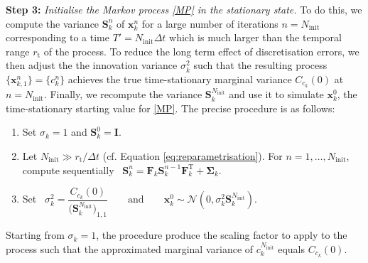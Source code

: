 \documentclass[12pt]{article} %
\newcommand{\cb}{\color{blue}}
\begin{document}
\noindent \textbf{Step 3:} {\em Initialise the Markov process \eqref{MP} in the stationary state.} 
To do this,
we compute the variance $\mathbf{S}^n_k$ of $\mathbf x_k^n$  for a large number of iterations $n=N_{\mathrm{init}}$ corresponding to a time $T'=N_{\mathrm{init}}\Delta t$ 
which is much larger than the temporal range $r_\mathrm{t}$ of the process. %
To reduce the long term effect of discretisation errors, we then
adjust the the innovation variance $\sigma_k^2$ such that the resulting process $\{\mathbf{x}_{k,1}^{n}\}=\{c_k^{n}\}$ achieves the true time-stationary marginal variance $C_{c_k}(0)$ at $n=N_{\mathrm{init}}$. Finally, we recompute the variance $\mathbf{S}_k^{N_{\mathrm{init}}}$ and use it to simulate $\boldsymbol{x}_k^0$, the time-stationary starting value for \eqref{MP}. The precise procedure is as follows:
\begin{enumerate}
    \item Set $\sigma_k = 1$ and $\mathbf{S}_k^0 = \mathbf{I}$.\medskip 
    \item Let $N_{\mathrm{init}} \gg r_\mathrm{t}/\Delta t$  (cf. Equation \eqref{eq:reparametrisation}). For $n = 1, \ldots, N_\mathrm{init}$, compute sequentially \ 
    \(
        \mathbf{S}_k^n = \mathbf{F}_k\mathbf{S}_k^{n-1}\mathbf{F}_k^\mathrm{T}+\boldsymbol{\Sigma}_k.
    \)\medskip
    \item  Set \
    \(
        \sigma_k^2 = \dfrac{C_{c_k}(0)}{{ (\mathbf{S}_{k}^{N_\mathrm{\mathrm{init}}}})_{1,1}}\qquad \text{and}\qquad \boldsymbol{x}_k^0\sim \mathcal N(0,\sigma_k^2
\mathbf{S}_k^{N_\mathrm{\mathrm{init}}}). 
    \)  
\end{enumerate}
Starting from $\sigma_k = 1$, the procedure produce the scaling factor to apply to the process such that the approximated marginal variance of $c_k^{N_\mathrm{init}}$ equals $C_{c_k}(0)$.
\end{document}
